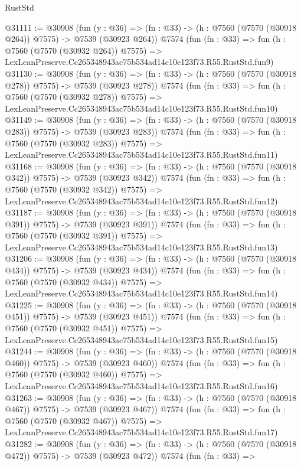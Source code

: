 \begin{lexlean}{RustStd}
\begin{coremodule}
@31111 := @30908
    (fun (y : @36) => (fn : @33) -> (h : @7560 (@7570 (@30918 @264)) @7575) -> @7539 (@30923 @264))
    @7574
    (fun (fn : @33) =>
    fun (h : @7560 (@7570 (@30932 @264)) @7575) =>
    LexLeanPreserve.Cc265348943ac75b534ad14c10e123f73.R55.RustStd.fun9)
@31130 := @30908
    (fun (y : @36) => (fn : @33) -> (h : @7560 (@7570 (@30918 @278)) @7575) -> @7539 (@30923 @278))
    @7574
    (fun (fn : @33) =>
    fun (h : @7560 (@7570 (@30932 @278)) @7575) =>
    LexLeanPreserve.Cc265348943ac75b534ad14c10e123f73.R55.RustStd.fun10)
@31149 := @30908
    (fun (y : @36) => (fn : @33) -> (h : @7560 (@7570 (@30918 @283)) @7575) -> @7539 (@30923 @283))
    @7574
    (fun (fn : @33) =>
    fun (h : @7560 (@7570 (@30932 @283)) @7575) =>
    LexLeanPreserve.Cc265348943ac75b534ad14c10e123f73.R55.RustStd.fun11)
@31168 := @30908
    (fun (y : @36) => (fn : @33) -> (h : @7560 (@7570 (@30918 @342)) @7575) -> @7539 (@30923 @342))
    @7574
    (fun (fn : @33) =>
    fun (h : @7560 (@7570 (@30932 @342)) @7575) =>
    LexLeanPreserve.Cc265348943ac75b534ad14c10e123f73.R55.RustStd.fun12)
@31187 := @30908
    (fun (y : @36) => (fn : @33) -> (h : @7560 (@7570 (@30918 @391)) @7575) -> @7539 (@30923 @391))
    @7574
    (fun (fn : @33) =>
    fun (h : @7560 (@7570 (@30932 @391)) @7575) =>
    LexLeanPreserve.Cc265348943ac75b534ad14c10e123f73.R55.RustStd.fun13)
@31206 := @30908
    (fun (y : @36) => (fn : @33) -> (h : @7560 (@7570 (@30918 @434)) @7575) -> @7539 (@30923 @434))
    @7574
    (fun (fn : @33) =>
    fun (h : @7560 (@7570 (@30932 @434)) @7575) =>
    LexLeanPreserve.Cc265348943ac75b534ad14c10e123f73.R55.RustStd.fun14)
@31225 := @30908
    (fun (y : @36) => (fn : @33) -> (h : @7560 (@7570 (@30918 @451)) @7575) -> @7539 (@30923 @451))
    @7574
    (fun (fn : @33) =>
    fun (h : @7560 (@7570 (@30932 @451)) @7575) =>
    LexLeanPreserve.Cc265348943ac75b534ad14c10e123f73.R55.RustStd.fun15)
@31244 := @30908
    (fun (y : @36) => (fn : @33) -> (h : @7560 (@7570 (@30918 @460)) @7575) -> @7539 (@30923 @460))
    @7574
    (fun (fn : @33) =>
    fun (h : @7560 (@7570 (@30932 @460)) @7575) =>
    LexLeanPreserve.Cc265348943ac75b534ad14c10e123f73.R55.RustStd.fun16)
@31263 := @30908
    (fun (y : @36) => (fn : @33) -> (h : @7560 (@7570 (@30918 @467)) @7575) -> @7539 (@30923 @467))
    @7574
    (fun (fn : @33) =>
    fun (h : @7560 (@7570 (@30932 @467)) @7575) =>
    LexLeanPreserve.Cc265348943ac75b534ad14c10e123f73.R55.RustStd.fun17)
@31282 := @30908
    (fun (y : @36) => (fn : @33) -> (h : @7560 (@7570 (@30918 @472)) @7575) -> @7539 (@30923 @472))
    @7574
    (fun (fn : @33) =>

\end{coremodule}
\end{lexlean}
